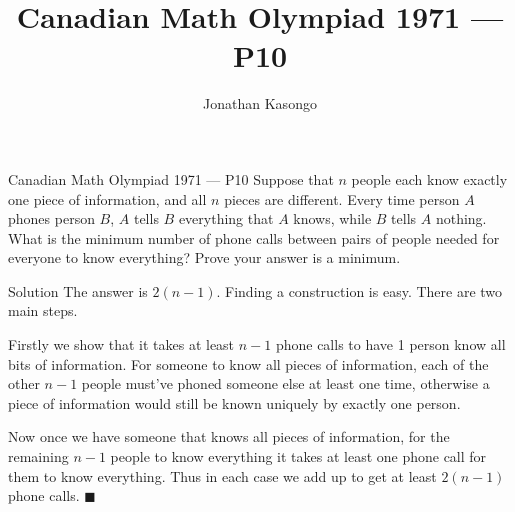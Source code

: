 \documentclass{article}
\author{Jonathan Kasongo}
\title{Canadian Math Olympiad 1971 --- P10}
\begin{document}
\maketitle

\begin{problem}{Canadian Math Olympiad 1971 --- P10}
Suppose that $n$ people each know exactly one piece of information,
and all $n$ pieces are different. Every time person $A$ phones person
$B$, $A$ tells $B$ everything that $A$ knows, while $B$ tells $A$ nothing.
What is the minimum number of phone calls between pairs of people
needed for everyone to know everything? Prove your answer is a minimum.
\end{problem}

\begin{solution}{Solution}
The answer is $2(n-1)$. Finding a construction is easy.
There are two main steps. \vspace{0.2cm}

Firstly we show that it takes at least $n-1$ phone calls to have
1 person know all bits of information. For someone to know
all pieces of information, each of the other $n-1$ people must've
phoned someone else at least one time, otherwise a piece of information
would still be known uniquely by exactly one person. \vspace{0.2cm}

Now once we have someone that knows all pieces of information, for the
remaining $n-1$ people to know everything it takes at least one phone
call for them to know everything. Thus in each case we add up to get
at least $2(n-1)$ phone calls. $\blacksquare$
\end{solution}
\end{document}
